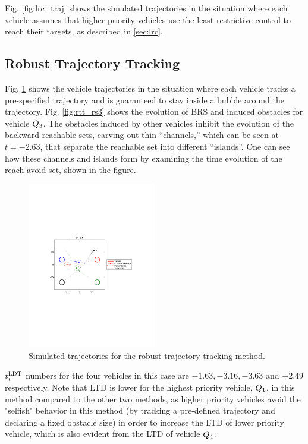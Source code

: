 Fig. \ref{fig:lrc_traj} shows the simulated trajectories in the situation where each vehicle assumes that higher priority vehicles use the least restrictive control to reach their targets, as described in \ref{sec:lrc}.

\subsection{Robust Trajectory Tracking}
Fig. \ref{fig:rtt_traj} shows the vehicle trajectories in the situation where each vehicle tracks a pre-specified trajectory and is guaranteed to stay inside a bubble around the trajectory. Fig. \ref{fig:rtt_rs3} shows the evolution of BRS and induced obstacles for vehicle $Q_3$. The obstacles induced by other vehicles inhibit the evolution of the backward reachable sets, carving out thin “channels,” which can be seen at $t = -2.63$, that separate the reachable set into different “islands”. One can see how these channels and islands form by examining the time evolution of the reach-avoid set, shown in the figure.

\begin{figure}
  \centering
  \includegraphics[width=0.5\textwidth]{"fig/rtt_traj"}
  \caption{Simulated trajectories for the robust trajectory tracking method.}
  \label{fig:rtt_traj}
\end{figure}

$t^\text{LDT}_i$ numbers for the four vehicles in this case are $-1.63, -3.16, -3.63$ and $-2.49$ respectively. Note that LTD is lower for the highest priority vehicle, $Q_1$, in this method compared to the other two methods, as higher priority vehicles avoid the "selfish" behavior in this method (by tracking a pre-defined trajectory and declaring a fixed obstacle size) in order to increase the LTD of lower priority vehicle, which is also evident from the LTD of vehicle $Q_4$. 


